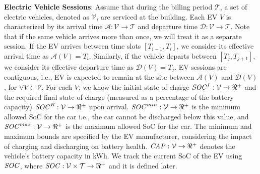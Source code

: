 \noindent \textbf{Electric Vehicle Sessions}: Assume that during the billing period $\mathcal{T}$, a set of electric vehicles, denoted as $\mathcal{V}$, are serviced at the building. Each EV $V$ is characterized by its arrival time $\mathcal{A}: \mathcal{V} \rightarrow  \mathcal{T}$ and departure time $\mathcal{D}: \mathcal{V} \rightarrow  \mathcal{T}$. Note that if the same vehicle arrives more than once, we will treat it as a separate session. If the EV arrives between time slots $[T_{i-1}, T_{i}]$, we consider its effective arrival time as $\mathcal{A}(V) = T_i$. Similarly, if the vehicle departs between $[T_{j}, T_{j+1}]$, we consider its effective departure time as $\mathcal{D}(V) = T_j$. EV sessions are contiguous, i.e., EV is expected to remain at the site between $\mathcal{A}(V)$ and $\mathcal{D}(V)$, for $\forall V \in \mathcal{V}$. 
For each  $V$, we know the initial state of charge   ${{\it SOC}^{I}}: \mathcal{V} \rightarrow \Re^+$ and the required final state of charge (measured as a percentage of the battery capacity)   ${{\it SOC}^{R}}: \mathcal{V} \rightarrow \Re^+$ upon arrival. ${{\it SOC}^{min}}: \mathcal{V} \rightarrow \Re^+$ is the minimum allowed SoC for the car i.e., the car cannot be discharged below this value, and ${{\it SOC}^{max}}: \mathcal{V} \rightarrow \Re^+$  is the maximum allowed SoC for the car. The minimum and maximum bounds are specified by the EV manufacturer, considering the impact of charging and discharging on battery health. ${\it CAP}:\mathcal{V} \rightarrow \Re^+$ denotes the vehicle's battery capacity in kWh. We track the current SoC of the EV using ${\it SOC}$, where ${\it SOC}: \mathcal{V} \times \mathcal{T} \rightarrow \Re^+$ and it is defined later.









